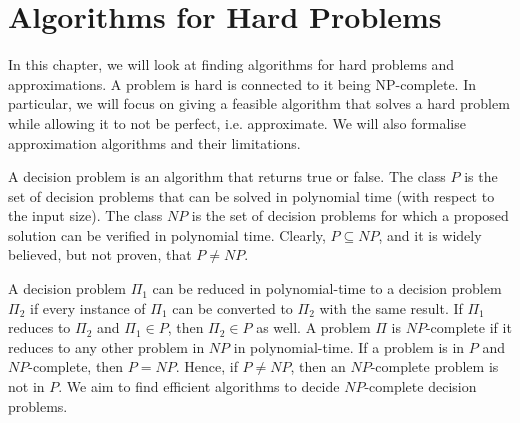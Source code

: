 \documentclass[a4paper, openany]{memoir}
\begin{document}
    \chapter{Algorithms for Hard Problems}
    In this chapter, we will look at finding algorithms for hard problems and approximations. A problem is hard is connected to it being NP-complete. In particular, we will focus on giving a feasible algorithm that solves a hard problem while allowing it to not be perfect, i.e. approximate. We will also formalise approximation algorithms and their limitations.

    A decision problem is an algorithm that returns true or false. The class $P$ is the set of decision problems that can be solved in polynomial time (with respect to the input size). The class $NP$ is the set of decision problems for which a proposed solution can be verified in polynomial time. Clearly, $P \subseteq NP$, and it is widely believed, but not proven, that $P \neq NP$.

    A decision problem $\Pi_1$ can be reduced in polynomial-time to a decision problem $\Pi_2$ if every instance of $\Pi_1$ can be converted to $\Pi_2$ with the same result. If $\Pi_1$ reduces to $\Pi_2$ and $\Pi_1 \in P$, then $\Pi_2 \in P$ as well. A problem $\Pi$ is $NP$-complete if it reduces to any other problem in $NP$ in polynomial-time. If a problem is in $P$ and $NP$-complete, then $P = NP$. Hence, if $P \neq NP$, then an $NP$-complete problem is not in $P$. We aim to find efficient algorithms to decide $NP$-complete decision problems.
\end{document}

